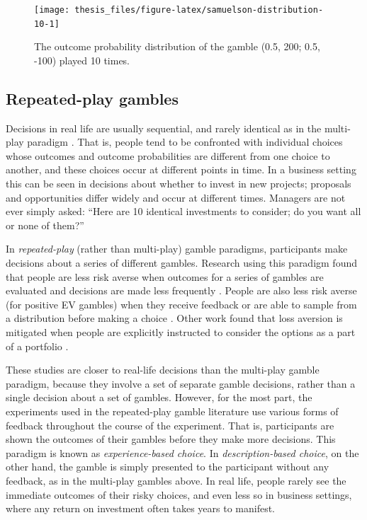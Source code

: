 \documentclass[a4paper, nobind, dvipsnames]{templates/ociamthesis}
\theoremstyle{definition}
\theoremstyle{definition}
\theoremstyle{definition}
\theoremstyle{definition}
\theoremstyle{remark}
\begin{document}
\begin{figure}
\texttt{[image: thesis\_files/figure-latex/samuelson-distribution-10-1]} \caption{The outcome probability distribution of the \textcite{samuelson1963} gamble (0.5, 200; 0.5, -100) played 10 times.}\label{fig:samuelson-distribution-10}
\end{figure}

\subsection{Repeated-play gambles}

Decisions in real life are usually sequential, and rarely identical as in the
multi-play paradigm \autocite[cf.][]{barron2003}. That is, people tend to be confronted
with individual choices whose outcomes and outcome probabilities are different
from one choice to another, and these choices occur at different points in time.
In a business setting this can be seen in decisions about whether to invest in
new projects; proposals and opportunities differ widely and occur at different
times. Managers are not ever simply asked: ``Here are 10 identical investments to
consider; do you want all or none of them?''

In \emph{repeated-play} (rather than multi-play) gamble paradigms, participants make
decisions about a series of different gambles. Research using this paradigm
found that people are less risk averse when outcomes for a series of gambles are
evaluated and decisions are made less frequently \autocite{gneezy1997,thaler1997,bellemare2005,beshears2016}. People are also less risk averse (for positive
EV gambles) when they receive feedback or are able to sample from a distribution
before making a choice \autocite{camilleri2011,camilleri2013,barron2003,wulff2018,ludvig2011,hertwig2004,jessup2008}. Other work found that loss
aversion is mitigated when people are explicitly instructed to consider the
options as a part of a portfolio \autocite{sokolhessner2009,sokolhessner2012}.

These studies are closer to real-life decisions than the multi-play gamble
paradigm, because they involve a set of separate gamble decisions, rather than a
single decision about a set of gambles. However, for the most part, the
experiments used in the repeated-play gamble literature use various forms of
feedback throughout the course of the experiment. That is, participants are
shown the outcomes of their gambles before they make more decisions. This
paradigm is known as \emph{experience-based choice}. In \emph{description-based choice},
on the other hand, the gamble is simply presented to the participant without any
feedback, as in the multi-play gambles above. In real life, people rarely see
the immediate outcomes of their risky choices, and even less so in business
settings, where any return on investment often takes years to manifest.
\end{document}
